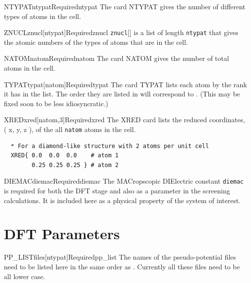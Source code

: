 \documentclass[11pt]{report}
\begin{document}
\begin{Card}{NTYPAT}{ntypat}{Required}{ntypat}
The card NTYPAT gives the number of different types of atoms in the cell. 
\end{Card}

\begin{Card}{ZNUCL}{znucl[ntypat]}{Required}{znucl}
\texttt{znucl}[] is a list of length \texttt{ntypat} that gives the atomic numbers of the types of atoms that are in the cell.
\end{Card}

\begin{Card}{NATOM}{natom}{Required}{natom}
The card NATOM gives the number of total atoms in the cell.
\end{Card}

\begin{Card}{TYPAT}{typat[natom]}{Required}{typat}
The card TYPAT lists each atom by the rank it has in the  list. The order they are listed in will correspond to . (This may be fixed soon to be less idiosyncratic.)
\end{Card}

\begin{Card}{XRED}{xred[natom,3]}{Required}{xred}
The XRED card lists the reduced coordinates, ( x, y, z ), of the all \texttt{natom} atoms in the cell.
  \begin{verbatim}
  * For a diamond-like structure with 2 atoms per unit cell
  XRED{ 0.0  0.0  0.0    # atom 1
        0.25 0.25 0.25 } # atom 2
  \end{verbatim}
\end{Card}

\begin{Card}{DIEMAC}{diemac}{Required}{diemac}
The MACropscopic DIElectric constant \texttt{diemac} is required for both the DFT stage and also as a parameter in the screening calculations. It is included here as a physical property of the system of interest.
\end{Card}

\section{DFT Parameters}
\label{sec:DFT-Parameters}


\begin{Card}{PP\_LIST}{files[ntypat]}{Required}{pp_list}
The names of the pseudo-potential files need to be listed here in the same order as . Currently all these files need to be all lower case.
\end{Card}
\end{document}
